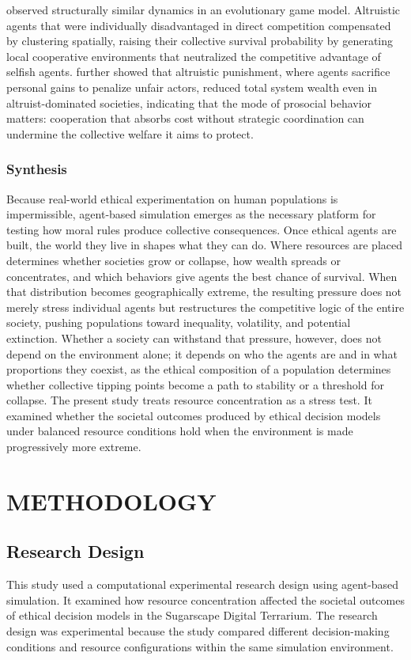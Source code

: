 \documentclass{icsthesis}
\begin{document}
\begin{mainmatter}
\citet{Xiang2008} observed structurally similar dynamics in an evolutionary game model. Altruistic agents that were individually disadvantaged in direct competition compensated by clustering spatially, raising their collective survival probability by generating local cooperative environments that neutralized the competitive advantage of selfish agents. \citet{Scalco2015} further showed that altruistic punishment, where agents sacrifice personal gains to penalize unfair actors, reduced total system wealth even in altruist-dominated societies, indicating that the mode of prosocial behavior matters: cooperation that absorbs cost without strategic coordination can undermine the collective welfare it aims to protect.

\subsubsection{Synthesis}
Because real-world ethical experimentation on human populations is impermissible, agent-based simulation emerges as the necessary platform for testing how moral rules produce collective consequences. Once ethical agents are built, the world they live in shapes what they can do. Where resources are placed determines whether societies grow or collapse, how wealth spreads or concentrates, and which behaviors give agents the best chance of survival. When that distribution becomes geographically extreme, the resulting pressure does not merely stress individual agents but restructures the competitive logic of the entire society, pushing populations toward inequality, volatility, and potential extinction. Whether a society can withstand that pressure, however, does not depend on the environment alone; it depends on who the agents are and in what proportions they coexist, as the ethical composition of a population determines whether collective tipping points become a path to stability or a threshold for collapse. The present study treats resource concentration as a stress test. It examined whether the societal outcomes produced by ethical decision models under balanced resource conditions hold when the environment is made progressively more extreme.

		\section{METHODOLOGY}
			\subsection{Research Design}
				This study used a computational experimental research design using agent-based simulation. It examined how resource concentration affected the societal outcomes of ethical decision models in the Sugarscape Digital Terrarium. The research design was experimental because the study compared different decision-making conditions and resource configurations within the same simulation environment.


\end{mainmatter}
\end{document}
